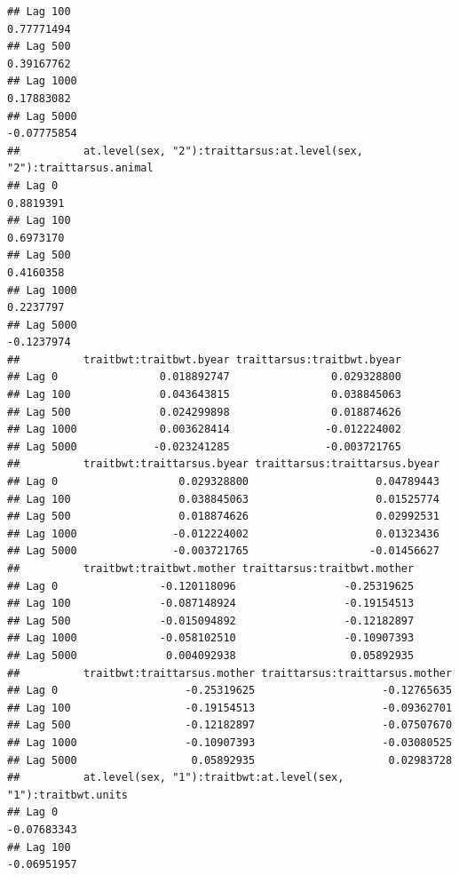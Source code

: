 \documentclass[
  12pt,
]{book}
\begin{document}
\begin{verbatim}
## Lag 100                                                         0.77771494
## Lag 500                                                         0.39167762
## Lag 1000                                                        0.17883082
## Lag 5000                                                       -0.07775854
##          at.level(sex, "2"):traittarsus:at.level(sex, "2"):traittarsus.animal
## Lag 0                                                               0.8819391
## Lag 100                                                             0.6973170
## Lag 500                                                             0.4160358
## Lag 1000                                                            0.2237797
## Lag 5000                                                           -0.1237974
##          traitbwt:traitbwt.byear traittarsus:traitbwt.byear
## Lag 0                0.018892747                0.029328800
## Lag 100              0.043643815                0.038845063
## Lag 500              0.024299898                0.018874626
## Lag 1000             0.003628414               -0.012224002
## Lag 5000            -0.023241285               -0.003721765
##          traitbwt:traittarsus.byear traittarsus:traittarsus.byear
## Lag 0                   0.029328800                    0.04789443
## Lag 100                 0.038845063                    0.01525774
## Lag 500                 0.018874626                    0.02992531
## Lag 1000               -0.012224002                    0.01323436
## Lag 5000               -0.003721765                   -0.01456627
##          traitbwt:traitbwt.mother traittarsus:traitbwt.mother
## Lag 0                -0.120118096                 -0.25319625
## Lag 100              -0.087148924                 -0.19154513
## Lag 500              -0.015094892                 -0.12182897
## Lag 1000             -0.058102510                 -0.10907393
## Lag 5000              0.004092938                  0.05892935
##          traitbwt:traittarsus.mother traittarsus:traittarsus.mother
## Lag 0                    -0.25319625                    -0.12765635
## Lag 100                  -0.19154513                    -0.09362701
## Lag 500                  -0.12182897                    -0.07507670
## Lag 1000                 -0.10907393                    -0.03080525
## Lag 5000                  0.05892935                     0.02983728
##          at.level(sex, "1"):traitbwt:at.level(sex, "1"):traitbwt.units
## Lag 0                                                      -0.07683343
## Lag 100                                                    -0.06951957

\end{verbatim}
\end{document}
